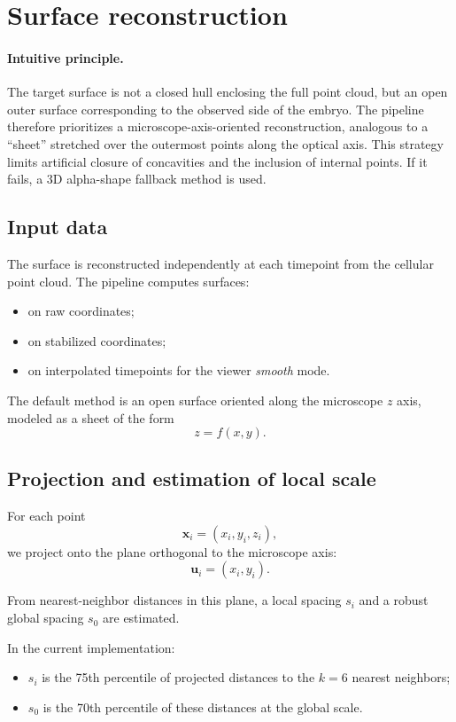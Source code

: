 \documentclass[11pt,a4paper]{article}
\begin{document}
\section{Surface reconstruction}

\paragraph{Intuitive principle.}
The target surface is not a closed hull enclosing the full point cloud, but an open outer surface corresponding to the observed side of the embryo. The pipeline therefore prioritizes a microscope-axis-oriented reconstruction, analogous to a ``sheet'' stretched over the outermost points along the optical axis. This strategy limits artificial closure of concavities and the inclusion of internal points. If it fails, a 3D alpha-shape fallback method is used.

\subsection{Input data}

The surface is reconstructed independently at each timepoint from the cellular point cloud. The pipeline computes surfaces:
\begin{itemize}
  \item on raw coordinates;
  \item on stabilized coordinates;
  \item on interpolated timepoints for the viewer \emph{smooth} mode.
\end{itemize}

The default method is an open surface oriented along the microscope $z$ axis, modeled as a sheet of the form
\[
z=f(x,y).
\]

\subsection{Projection and estimation of local scale}

For each point
\[
\mathbf{x}_i=(x_i,y_i,z_i),
\]
we project onto the plane orthogonal to the microscope axis:
\[
\mathbf{u}_i=(x_i,y_i).
\]

From nearest-neighbor distances in this plane, a local spacing $s_i$ and a robust global spacing $s_0$ are estimated.

In the current implementation:
\begin{itemize}
  \item $s_i$ is the 75th percentile of projected distances to the $k=6$ nearest neighbors;
  \item $s_0$ is the 70th percentile of these distances at the global scale.
\end{itemize}
\end{document}
